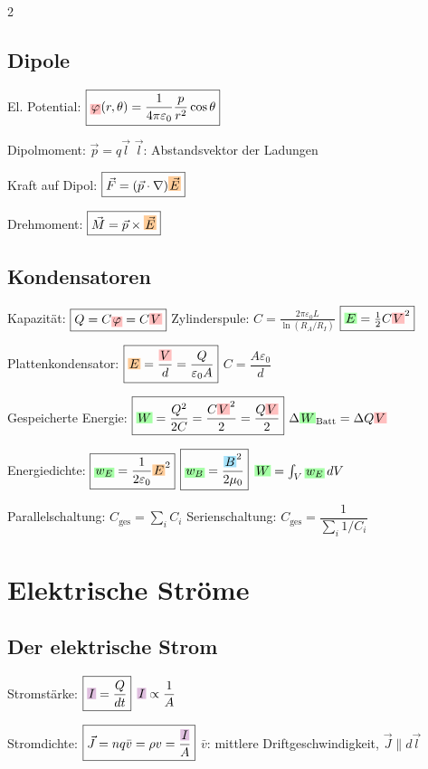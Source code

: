 \documentclass[10pt,a4paper]{article}
\newcommand{\ec}[1]{{\setlength\fboxsep{1pt}\colorbox{green!35}{\ensuremath{#1}}}}
\newcommand{\icc}[1]{{\setlength\fboxsep{1pt}\colorbox{violet!25}{\ensuremath{#1}}}}
\newcommand{\efc}[1]{{\setlength\fboxsep{1pt}\colorbox{orange!40}{\ensuremath{#1}}}}
\newcommand{\bfc}[1]{{\setlength\fboxsep{1pt}\colorbox{cyan!35}{\ensuremath{#1}}}}
\newcommand{\vc}[1]{{\setlength\fboxsep{1pt}\colorbox{red!25}{\ensuremath{#1}}}}
\begin{document}
\begin{multicols}{2}
\subsection{Dipole}

El. Potential: $\boxed{\vc{\varphi}(r,\theta)=\dfrac{1}{4\pi\varepsilon_0}\dfrac{p}{r^2}\cos\theta}$

Dipolmoment: $\boxed{\vec{p}=q\vec{l}}$ \quad $\vec{l}$: Abstandsvektor der Ladungen

Kraft auf Dipol: $\boxed{\vec{F}=(\vec{p}\cdot\nabla)\efc{\vec{E}}}$

Drehmoment: $\boxed{\vec{M}=\vec{p}\times\efc{\vec{E}}}$

\subsection{Kondensatoren}

Kapazität: $\boxed{Q=C\vc{\varphi}=C\vc{V}}$ \quad Zylinderspule: $\boxed{C=\tfrac{2\pi\varepsilon_0 L}{\ln(R_A/R_I)}}$ \quad $\boxed{\ec{E}=\tfrac{1}{2}C\vc{V}^2}$

Plattenkondensator: $\boxed{\efc{E}=\dfrac{\vc{V}}{d}=\dfrac{Q}{\varepsilon_0 A}}$ \quad $\boxed{C=\dfrac{A\varepsilon_0}{d}}$

Gespeicherte Energie: $\boxed{\ec{W}=\dfrac{Q^2}{2C}=\dfrac{C\vc{V}^2}{2}=\dfrac{Q\vc{V}}{2}}$ \quad $\Delta \ec{W}_{\text{Batt}}=\Delta Q\vc{V}$

Energiedichte: $\boxed{\ec{w_E}=\dfrac{1}{2\varepsilon_0}\efc{E}^2}$ \quad $\boxed{\ec{w_B}=\dfrac{\bfc{B}^2}{2\mu_0}}$ \quad $\ec{W}=\int_V \ec{w_E}\,dV$

Parallelschaltung: $\boxed{C_{\text{ges}}=\sum_i C_i}$ \quad Serienschaltung: $\boxed{C_{\text{ges}}=\dfrac{1}{\sum_i 1/C_i}}$

\section{Elektrische Ströme}

\subsection{Der elektrische Strom}

Stromstärke: $\boxed{\icc{I}=\dfrac{Q}{dt}}$ \quad $\icc{I}\propto\dfrac{1}{A}$

Stromdichte: $\boxed{\vec{J}=nq\bar{v}=\rho v=\dfrac{\icc{I}}{A}}$ \quad $\bar{v}$: mittlere Driftgeschwindigkeit, $\vec{J}\parallel d\vec{l}$


\end{multicols}
\end{document}
